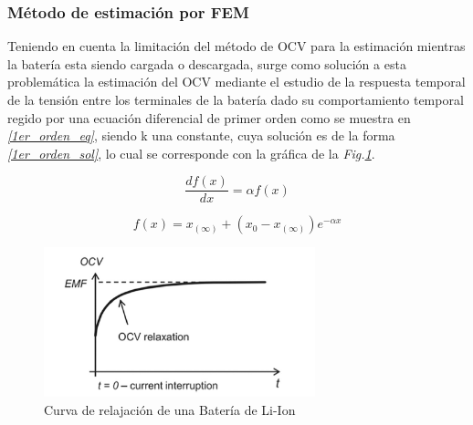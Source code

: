 \documentclass[10pt,a4paper]{article}
\begin{document}
	\subsubsection{Método de estimación por FEM}
	Teniendo en cuenta la limitación del método de OCV para la estimación mientras la batería esta siendo cargada o descargada, surge como solución a esta problemática la estimación del OCV mediante el estudio de la respuesta temporal de la tensión entre los terminales de la batería dado su comportamiento temporal regido por una ecuación diferencial de primer orden como se muestra en \emph{\ref{1er_orden_eq}}, siendo k una constante, cuya solución es de la forma \emph{\ref{1er_orden_sol}}, lo cual se corresponde con la gráfica de la \emph{Fig.\ref{EMF_Method}}.
	
	\begin{figure}[h!]
		\begin{center}
			\begin{equation}
				\frac{df(x)}{dx} = \alpha f(x)
				\label{1er_orden_eq}
			\end{equation}	
		\end{center}
	\end{figure}
	
	\begin{figure}[h!]
		\begin{center}
			\begin{equation}
				f(x)= x_{(\infty)}+(x_0-x_{(\infty)})e^{-\alpha x}
				\label{1er_orden_sol}
			\end{equation}	
		\end{center}
	\end{figure}
	
	\begin{figure}[h!]
		\begin{center}
			\includegraphics[width=0.7\textwidth]{EMF_Relaxation.png}
			\caption{Curva de relajación de una Batería de Li-Ion}
			\label{EMF_Method}
		\end{center}
	\end{figure}
	
\end{document}
